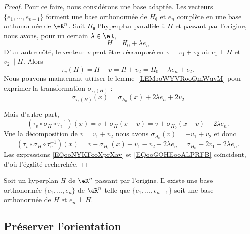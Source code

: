 \begin{proof}
	Pour ce faire, nous considérons une base adaptée. Les vecteurs \( \{ e_1,\ldots, e_{n-1} \}\) forment une base orthonormée de \( H_0\) et \( e_n\) complète en une base orthonormée de \( \eR^n\). Soit \( H_0\) l'hyperplan parallèle à \( H\) et passant par l'origine; nous avons, pour un certain \( \lambda\in \eR\),
	\begin{equation}
		H=H_0+\lambda e_n
	\end{equation}
	D'un autre côté, le vecteur \( v\) peut être décomposé en \( v=v_1+v_2\) où \( v_1\perp H\) et \( v_2\parallel H\). Alors
	\begin{equation}
		\tau_v(H)=H+v=H+v_2=H_0+\lambda e_n+v_2.
	\end{equation}
	Nous pouvons maintenant utiliser le lemme~\ref{LEMooWYVRooQmWqvM} pour exprimer la transformation \( \sigma_{\tau_v(H)}\) :
	\begin{equation}        \label{EQooNYKFooXprXav}
		\sigma_{\tau_v(H)}(x)=\sigma_{H_0}(x)+ 2\lambda e_n+2v_2
	\end{equation}

	Mais d'autre part,
	\begin{equation}
		(\tau_v\circ \sigma_H\circ\tau_{v}^{-1})(x)=v+\sigma_H(x-v)=v+\sigma_{H_0}(x-v)+2\lambda e_n.
	\end{equation}
	Vue la décomposition de \( v=v_1+v_2\) nous avons \( \sigma_{H_0}(v)=-v_1+v_2\) et donc
	\begin{equation}        \label{EQooGOHEooALPRFB}
		(\tau_v\circ \sigma_H\circ\tau_{v}^{-1})(x)= v+  \sigma_{H_0}(x)+v_1-v_2+2\lambda e_n=\sigma_{H_0}+2v_1+2\lambda e_n.
	\end{equation}
	Les expressions \eqref{EQooNYKFooXprXav} et \eqref{EQooGOHEooALPRFB} coïncident, d'où l'égalité recherchée.
\end{proof}

\begin{proposition}     \label{PROPooLYCUooRQgGtF}
	Soit un hyperplan \( H\) de \( \eR^n\) passant par l'origine. Il existe une base orthonormée \( \{ e_1,\ldots, e_n \}\) de \( \eR^n\) telle que \( \{ e_1,\ldots, e_{n-1} \}\) soit une base orthonormée de \( H\) et \( e_n\perp H\).
\end{proposition}

\subsection{Préserver l'orientation}


